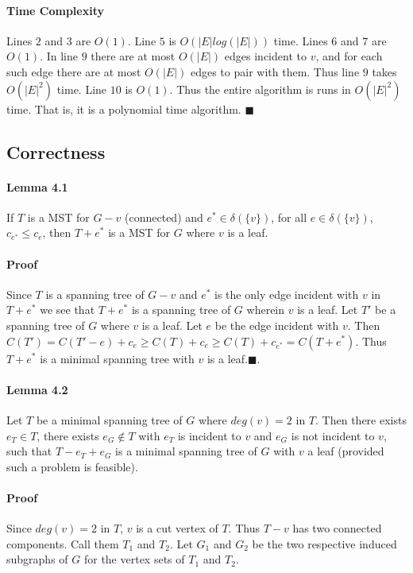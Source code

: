 \documentclass[letterpaper,12pt,oneside,onecolumn]{report}
\begin{document}
\paragraph{Time Complexity}
Lines $2$ and $3$ are $O(1)$. Line $5$ is $O(|E|log(|E|))$ time. Lines $6$ and $7$ are $O(1)$. In line $9$ there are at most $O(|E|)$ edges incident to $v$, and for each such edge there are at most $O(|E|)$ edges to pair with them. Thus line $9$ takes $O(|E|^2)$ time. Line $10$ is $O(1)$. Thus the entire algorithm is runs in $O(|E|^2)$ time. That is, it is a polynomial time algorithm. $\blacksquare$
\subsection*{Correctness}
\paragraph{Lemma 4.1}
If $T$ is a MST for $G-v$ (connected) and $e^* \in \delta(\{v\})$, for all $e \in \delta(\{v\})$, $c_{e^*} \leq c_e$, then $T + e^*$ is a MST for $G$ where $v$ is a leaf.
\paragraph{Proof}
Since $T$ is a spanning tree of $G-v$ and $e^*$ is the only edge incident with $v$ in $T + e^*$ we see that $T+e^*$ is a spanning tree of $G$ wherein $v$ is a leaf.
Let $T'$ be a spanning tree of $G$ where $v$ is a leaf. Let $e$ be the edge incident with $v$. Then $C(T') = C(T'-e) + c_e \geq C(T) + c_e \geq C(T) + c_{e^*} = C(T+e^*)$. Thus $T + e^*$ is a minimal spanning tree with $v$ is a leaf.$\blacksquare$.
\paragraph{Lemma 4.2}
Let $T$ be a minimal spanning tree of $G$ where $deg(v) = 2$ in $T$. Then there exists $e_T \in T$, there exists $e_G \not \in T$ with $e_T$ is incident to $v$ and $e_G$ is not incident to $v$, such that $T - e_T + e_G$ is a minimal spanning tree of $G$ with $v$ a leaf (provided such a problem is feasible).
\paragraph{Proof}
Since $deg(v) = 2$ in $T$, $v$ is a cut vertex of $T$. Thus $T-v$ has two connected components. Call them $T_1$ and $T_2$. Let $G_1$ and $G_2$ be the two respective induced subgraphs of $G$ for the vertex sets of $T_1$ and $T_2$.
\end{document}
